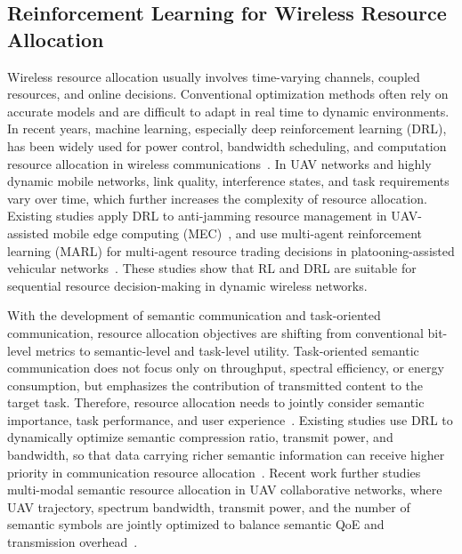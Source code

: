 \documentclass[journal]{IEEEtran}
\begin{document}
\subsection{Reinforcement Learning for Wireless Resource Allocation}

Wireless resource allocation usually involves time-varying channels, coupled resources, and online decisions. Conventional optimization methods often rely on accurate models and are difficult to adapt in real time to dynamic environments. In recent years, machine learning, especially deep reinforcement learning (DRL), has been widely used for power control, bandwidth scheduling, and computation resource allocation in wireless communications~\cite{D1}. In UAV networks and highly dynamic mobile networks, link quality, interference states, and task requirements vary over time, which further increases the complexity of resource allocation. Existing studies apply DRL to anti-jamming resource management in UAV-assisted mobile edge computing (MEC)~\cite{D2}, and use multi-agent reinforcement learning (MARL) for multi-agent resource trading decisions in platooning-assisted vehicular networks~\cite{D3}. These studies show that RL and DRL are suitable for sequential resource decision-making in dynamic wireless networks.

With the development of semantic communication and task-oriented communication, resource allocation objectives are shifting from conventional bit-level metrics to semantic-level and task-level utility. Task-oriented semantic communication does not focus only on throughput, spectral efficiency, or energy consumption, but emphasizes the contribution of transmitted content to the target task. Therefore, resource allocation needs to jointly consider semantic importance, task performance, and user experience~\cite{D4}. Existing studies use DRL to dynamically optimize semantic compression ratio, transmit power, and bandwidth, so that data carrying richer semantic information can receive higher priority in communication resource allocation~\cite{D5}. Recent work further studies multi-modal semantic resource allocation in UAV collaborative networks, where UAV trajectory, spectrum bandwidth, transmit power, and the number of semantic symbols are jointly optimized to balance semantic QoE and transmission overhead~\cite{D6}.
\end{document}
